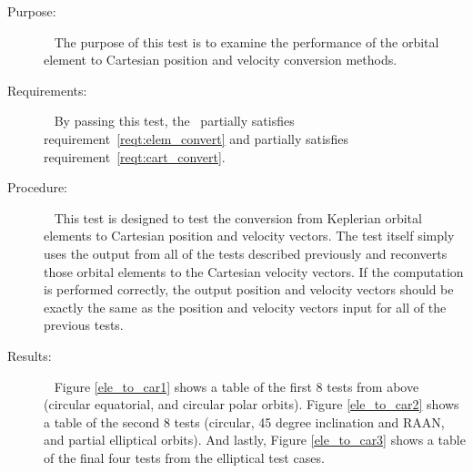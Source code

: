 \label{test:pv_conv}
\begin{description}
\item[Purpose:] \ \newline
The purpose of this test is to examine the performance of the orbital element
to Cartesian position and velocity conversion methods.
\item[Requirements:] \ \newline
By passing this test, the \OrbitalElement\ partially satisfies
requirement~\ref{reqt:elem_convert} and partially satisfies
requirement~\ref{reqt:cart_convert}.
\item[Procedure:]\ \newline
This test is designed to test the conversion from Keplerian orbital elements
to Cartesian position and velocity vectors.  The test itself simply uses the
output from all of the tests described previously and reconverts those orbital
elements to the Cartesian velocity vectors.  If the computation is performed
correctly, the output position and velocity vectors should be exactly the
same as the position and velocity vectors input for all of the previous tests.
\item[Results:]\ \newline
Figure \ref{ele_to_car1} shows a table of the first 8 tests from above
(circular equatorial, and circular polar orbits).  Figure \ref{ele_to_car2}
shows a table of the second 8 tests (circular, 45 degree inclination and RAAN,
and partial elliptical orbits).  And lastly, Figure \ref{ele_to_car3} shows
a table of the final four tests from the elliptical test cases.


\end{description}
